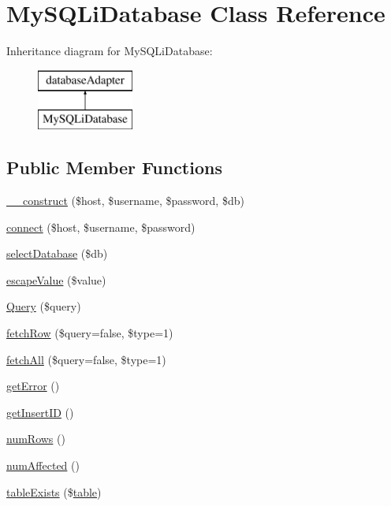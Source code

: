 \hypertarget{class_my_s_q_li_database}{
\section{MySQLiDatabase Class Reference}
\label{class_my_s_q_li_database}
}
Inheritance diagram for MySQLiDatabase:\begin{figure}[H]
\begin{center}
\leavevmode
\includegraphics[height=2.000000cm]{class_my_s_q_li_database}
\end{center}
\end{figure}
\subsection*{Public Member Functions}
\begin{DoxyCompactItemize}
\item 
\hyperlink{class_my_s_q_li_database_a81fcddb424f13e0862ee3f7e1ea57ce9}{\_\-\_\-construct} (\$host, \$username, \$password, \$db)
\item 
\hyperlink{class_my_s_q_li_database_a4c4f3316747e665b9e02f6ddcba4117c}{connect} (\$host, \$username, \$password)
\item 
\hyperlink{class_my_s_q_li_database_ab624b0b234f9db9dbc6dc4180f566b1f}{selectDatabase} (\$db)
\item 
\hyperlink{class_my_s_q_li_database_a039ae2e8f2bf579fd75d9df8df87eee3}{escapeValue} (\$value)
\item 
\hyperlink{class_my_s_q_li_database_aebc962126fd37fd3478c4689156d5f83}{Query} (\$query)
\item 
\hyperlink{class_my_s_q_li_database_acdee1c4e55c3792b3dbfeedfac35912f}{fetchRow} (\$query=false, \$type=1)
\item 
\hyperlink{class_my_s_q_li_database_a1750ab2493620de034b80a77577f3e8b}{fetchAll} (\$query=false, \$type=1)
\item 
\hyperlink{class_my_s_q_li_database_a24ada5decce3d1b79cd82f5a90ccf404}{getError} ()
\item 
\hyperlink{class_my_s_q_li_database_ac73f1d8cddbdfc35ca442189378a073c}{getInsertID} ()
\item 
\hyperlink{class_my_s_q_li_database_af37433a300db1f607ee789d22828a0a0}{numRows} ()
\item 
\hyperlink{class_my_s_q_li_database_acac8dfe61e7840f9a1e672ebede0be21}{numAffected} ()
\item 
\hyperlink{class_my_s_q_li_database_ae7cdaa744d52a1eb0103e377023ca528}{tableExists} (\$\hyperlink{classtable}{table})
\end{DoxyCompactItemize}
